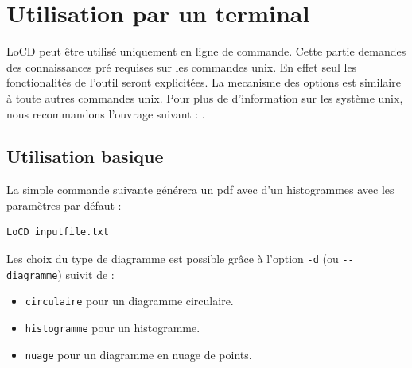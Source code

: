 \chapter{Utilisation par un terminal}
\label{chap:useterm}

\renewcommand{\labelitemi}{$\bullet$} %

LoCD peut être utilisé uniquement en ligne de commande. Cette partie demandes des connaissances pré requises sur les commandes unix. En effet seul les fonctionalités de l'outil seront explicitées. La mecanisme des options est similaire à toute autres commandes unix. Pour plus de d'information sur les système unix, nous recommandons l'ouvrage suivant : \cite{linux}.


\section{Utilisation basique}
\label{sec:usebas}
La simple commande suivante générera un pdf avec d'un histogrammes avec les paramètres par défaut : %
\begin{verbatim}LoCD inputfile.txt\end{verbatim}Les choix du type de diagramme est possible grâce à l'option \verb+-d+ (ou \verb+--diagramme+) suivit de : 
\begin{itemize}
\item
\verb+circulaire+ pour un diagramme circulaire.
\item
\verb+histogramme+ pour un histogramme.
\item
\verb+nuage+ pour un diagramme en nuage de points.
\end{itemize}


